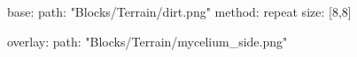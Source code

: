 base:
  path: "Blocks/Terrain/dirt.png"
  method: repeat
  size: [8,8]

overlay:
  path: "Blocks/Terrain/mycelium_side.png"